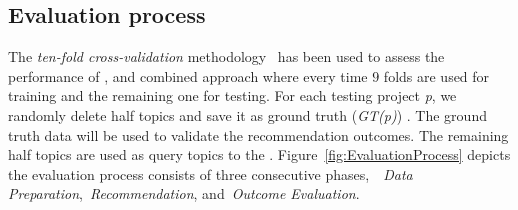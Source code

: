 



\subsection{Evaluation process}\label{sec:methodology-metric}
The \emph{ten-fold cross-validation} methodology~\cite{kohavi1995study} has been used to assess the performance of \TF, \MNB and combined approach where every time $9$ folds 
are used for training and the remaining one for testing.
For each testing project \emph{p}, we randomly delete half topics and save it as ground truth (\emph{GT(p)}) . The ground truth data  will be used to validate the recommendation outcomes. The remaining half topics are used as query topics to the \TF.
Figure~\ref{fig:EvaluationProcess} depicts the evaluation process consists of three consecutive phases,~\ie~\emph{Data Preparation},~\emph{Recommendation}, and~\emph{Outcome Evaluation}.

